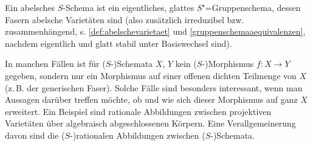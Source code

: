 \begin{Definition}
  Ein abelsches $S$-Schema ist ein eigentliches, glattes $S$"=Gruppenschema,
  dessen Fasern abelsche Varietäten sind 
  (also zusätzlich irreduzibel bzw. zusammenhängend,
  s. \ref{def:abelschevarietaet} und \ref{gruppenschemaaequivalenzen},
  nachdem eigentlich und glatt stabil unter Basiswechsel sind).
\end{Definition}

In manchen Fällen ist für ($S$-)Schemata $X$, $Y$ kein
($S$-)Morphismus $f\colon X\to Y$ gegeben, sondern nur ein Morphismus
auf einer offenen dichten Teilmenge von $X$ (z.\,B. der generischen
Faser). Solche Fälle sind besonders interessant, wenn man Aussagen
darüber treffen möchte, ob und wie sich dieser Morphismus auf ganz $X$
erweitert. Ein Beispiel sind rationale Abbildungen zwischen
projektiven Varietäten über algebraisch abgeschlossenen Körpern.
Eine Verallgemeinerung davon sind die ($S$-)rationalen Abbildungen
zwischen ($S$-)Schemata.
